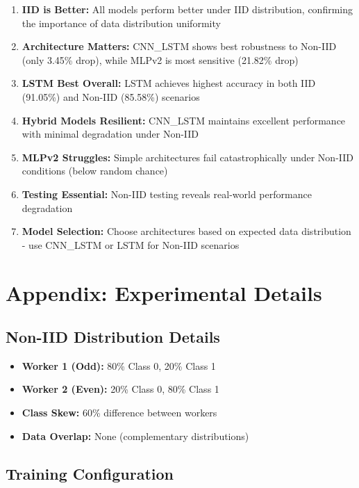 \documentclass[12pt,a4paper]{article}
\begin{document}
\begin{enumerate}
    \item \textbf{IID is Better:} All models perform better under IID distribution, confirming the importance of data distribution uniformity
    \item \textbf{Architecture Matters:} CNN\_LSTM shows best robustness to Non-IID (only 3.45\% drop), while MLPv2 is most sensitive (21.82\% drop)
    \item \textbf{LSTM Best Overall:} LSTM achieves highest accuracy in both IID (91.05\%) and Non-IID (85.58\%) scenarios
    \item \textbf{Hybrid Models Resilient:} CNN\_LSTM maintains excellent performance with minimal degradation under Non-IID
    \item \textbf{MLPv2 Struggles:} Simple architectures fail catastrophically under Non-IID conditions (below random chance)
    \item \textbf{Testing Essential:} Non-IID testing reveals real-world performance degradation
    \item \textbf{Model Selection:} Choose architectures based on expected data distribution - use CNN\_LSTM or LSTM for Non-IID scenarios
\end{enumerate}

\section{Appendix: Experimental Details}

\subsection{Non-IID Distribution Details}

\begin{itemize}
    \item \textbf{Worker 1 (Odd):} 80\% Class 0, 20\% Class 1
    \item \textbf{Worker 2 (Even):} 20\% Class 0, 80\% Class 1
    \item \textbf{Class Skew:} 60\% difference between workers
    \item \textbf{Data Overlap:} None (complementary distributions)
\end{itemize}

\subsection{Training Configuration}
\end{document}
